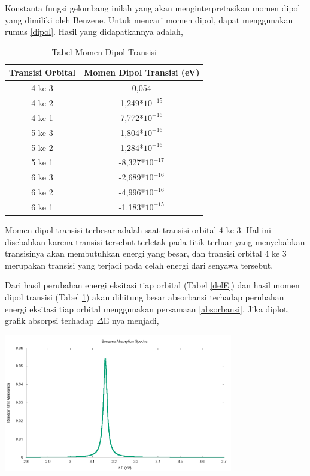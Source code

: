 \documentclass[12pt,a4paper]{report}
\begin{document}
Konstanta fungsi gelombang inilah yang akan menginterpretasikan momen dipol yang dimiliki oleh Benzene. Untuk mencari momen dipol, dapat menggunakan rumus \ref{dipol}. Hasil yang didapatkannya adalah,
\begin{table}[h]
	\centering
	\caption{Tabel Momen Dipol Transisi}
	\label{momendipol}
	\begin{tabular}{|c|c|} 
		\hline
		Transisi Orbital & Momen Dipol Transisi (eV) \\ \hline
		4 ke 3 & 0,054 \\ \hline
		4 ke 2 & 1,249*$10^{-15}$ \\ \hline
		4 ke 1 & 7,772*$10^{-16}$ \\ \hline
		5 ke 3 & 1,804*$10^{-16}$ \\ \hline
		5 ke 2 & 1,284*$10^{-16}$ \\ \hline
		5 ke 1 & -8,327*$10^{-17}$ \\ \hline
		6 ke 3 & -2,689*$10^{-16}$ \\ \hline
		6 ke 2 & -4,996*$10^{-16}$ \\ \hline
		6 ke 1 & -1.183*$10^{-15}$ \\ \hline
	\end{tabular}
\end{table}

Momen dipol transisi terbesar adalah saat transisi orbital 4 ke 3. Hal ini disebabkan karena transisi tersebut terletak pada titik terluar yang menyebabkan transisinya akan membutuhkan energi yang besar, dan transisi orbital 4 ke 3 merupakan transisi yang terjadi pada celah energi dari senyawa tersebut.

Dari hasil perubahan energi eksitasi tiap orbital (Tabel \ref{delE}) dan hasil momen dipol transisi (Tabel \ref{momendipol}) akan dihitung besar absorbansi terhadap perubahan energi eksitasi tiap orbital menggunakan persamaan \ref{absorbansi}. Jika diplot, grafik absorpsi terhadap $\Delta$E nya menjadi, 
\begin{center}
	\includegraphics[width=10cm]{gambar/spectra-benzene.png}
	\label{absorbance_benzene}
\end{center}
\end{document}

